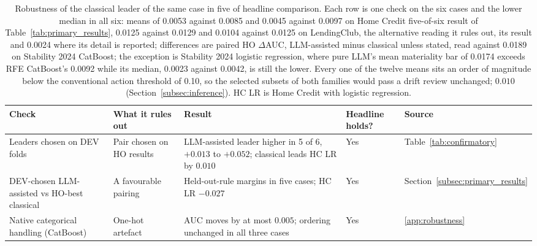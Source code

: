 \documentclass[final,5p,twocolumn]{elsarticle}
\providecommand{\DIFaddtex}[1]{{\protect\color{blue} \sf #1}} %
\providecommand{\DIFdeltex}[1]{{\protect\color{red} \scriptsize #1}} %
\providecommand{\DIFaddFL}[1]{\DIFadd{#1}} %
\providecommand{\DIFdelFL}[1]{\DIFdel{#1}} %
\providecommand{\DIFaddbeginFL}{} %
\providecommand{\DIFaddendFL}{} %
\providecommand{\DIFdelbeginFL}{} %
\providecommand{\DIFdelendFL}{} %
\providecommand{\DIFadd}[1]{\texorpdfstring{\DIFaddtex{#1}}{#1}} %
\providecommand{\DIFdel}[1]{\texorpdfstring{\DIFdeltex{#1}}{}} %
\begin{document}
\begin{table}[htbp]
\centering
\footnotesize
\setlength{\tabcolsep}{4pt}
\begin{threeparttable}
\caption{\DIFaddFL{Robustness of }\DIFaddendFL the \DIFdelbeginFL \DIFdelFL{classical leader of the same case in five of }\DIFdelendFL \DIFaddbeginFL \DIFaddFL{headline comparison. Each row is one check on }\DIFaddendFL the \DIFdelbeginFL \DIFdelFL{six cases and the lower median in all six: means of 0.0053 against 0.0085 and 0.0045 against 0.0097 on Home Credit }\DIFdelendFL \DIFaddbeginFL \DIFaddFL{five-of-six result of Table~\ref{tab:primary_results}}\DIFaddendFL , \DIFdelbeginFL \DIFdelFL{0.0125 against 0.0129 and 0.0104 against 0.0125 on LendingClub, }\DIFdelendFL \DIFaddbeginFL \DIFaddFL{the alternative reading it rules out, its result }\DIFaddendFL and \DIFdelbeginFL \DIFdelFL{0.0024 }\DIFdelendFL \DIFaddbeginFL \DIFaddFL{where its detail is reported; differences are paired HO $\Delta$AUC, LLM-assisted minus classical unless stated, read }\DIFaddendFL against \DIFdelbeginFL \DIFdelFL{0.0189 on Stability 2024 CatBoost; }\DIFdelendFL the \DIFdelbeginFL \DIFdelFL{exception is Stability 2024 logistic regression, where pure LLM's mean }\DIFdelendFL \DIFaddbeginFL \DIFaddFL{materiality bar }\DIFaddendFL of \DIFdelbeginFL \DIFdelFL{0.0174 exceeds RFE CatBoost's 0.0092 while its median, 0.0023 against 0.0042, is still the lower. Every one of the twelve means sits an order of magnitude below the conventional action threshold of 0.10, so the selected subsets of both families would pass a drift review unchanged; }\DIFdelendFL \DIFaddbeginFL \DIFaddFL{$0.010$ (Section~\ref{subsec:inference}). HC LR is Home Credit with logistic regression.}}
\label{tab:robustness}
\begin{tabular}{@{}L{30mm}L{24mm}L{\dimexpr\textwidth-30mm-24mm-12mm-27mm-8\tabcolsep\relax}L{12mm}L{27mm}@{}}
\toprule
Check & What it rules out & Result & Headline holds? & Source \\
\midrule
Leaders chosen on DEV folds & Pair chosen on HO results & LLM-assisted leader higher in 5 of 6, $+0.013$ to $+0.052$; classical leads HC LR by $0.010$ & Yes & Table~\ref{tab:confirmatory} \\
\addlinespace
DEV-chosen LLM-assisted vs HO-best classical & A favourable pairing & Held-out-rule margins in five cases; HC LR $-0.027$ & Yes & Section~\ref{subsec:primary_results} \\
\addlinespace
Native categorical handling (CatBoost) & One-hot artefact & AUC moves by at most $0.005$; ordering unchanged in all three cases & Yes & \ref{app:robustness} \\

\end{tabular}
\end{threeparttable}
\end{table}
\end{document}
